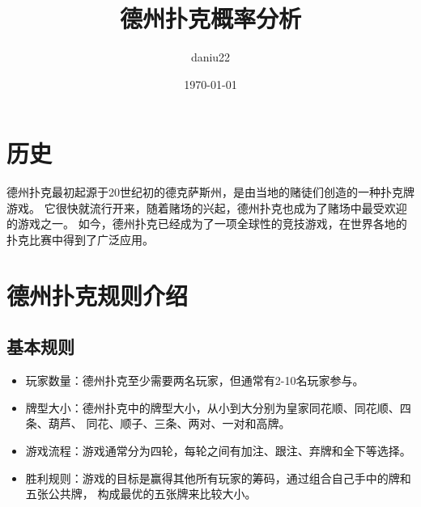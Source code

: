 \documentclass[UTF8]{ctexart}
\title{德州扑克概率分析}
\author{daniu22}
\date{\today}
\begin{document}
\maketitle
\newpage
\tableofcontents
\newpage
\section{历史}
德州扑克最初起源于20世纪初的德克萨斯州，是由当地的赌徒们创造的一种扑克牌游戏。
它很快就流行开来，随着赌场的兴起，德州扑克也成为了赌场中最受欢迎的游戏之一。
如今，德州扑克已经成为了一项全球性的竞技游戏，在世界各地的扑克比赛中得到了广泛应用。
\section{德州扑克规则介绍}
\subsection{基本规则}
\begin{itemize}
    \item 玩家数量：德州扑克至少需要两名玩家，但通常有2-10名玩家参与。
    \item 牌型大小：德州扑克中的牌型大小，从小到大分别为皇家同花顺、同花顺、四条、葫芦、
    同花、顺子、三条、两对、一对和高牌。
    \item 游戏流程：游戏通常分为四轮，每轮之间有加注、跟注、弃牌和全下等选择。
    \item 胜利规则：游戏的目标是赢得其他所有玩家的筹码，通过组合自己手中的牌和五张公共牌，
    构成最优的五张牌来比较大小。
\end{itemize}
\end{document}
